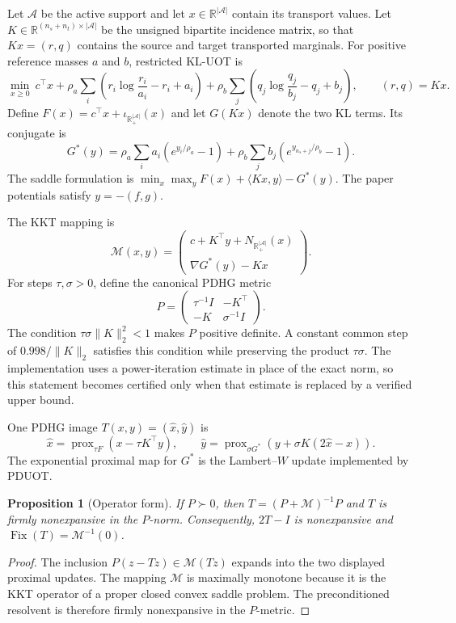 \documentclass[11pt]{article}
\newtheorem{proposition}{Proposition}
\newcommand{\R}{\mathbb{R}}
\newcommand{\prox}{\operatorname{prox}}
\newcommand{\Fix}{\operatorname{Fix}}
\begin{document}
Let $\mathcal A$ be the active support and let $x\in\R^{|\mathcal A|}$ contain its transport values.
Let $K\in\R^{(n_s+n_t)\times|\mathcal A|}$ be the unsigned bipartite incidence matrix, so that $Kx=(r,q)$ contains the source and target transported marginals.
For positive reference masses $a$ and $b$, restricted KL-UOT is
$$\min_{x\geq 0}\ c^\top x+\rho_a\sum_i\left(r_i\log\frac{r_i}{a_i}-r_i+a_i\right)+\rho_b\sum_j\left(q_j\log\frac{q_j}{b_j}-q_j+b_j\right),\qquad (r,q)=Kx.$$
Define $F(x)=c^\top x+\iota_{\R_+^{|\mathcal A|}}(x)$ and let $G(Kx)$ denote the two KL terms.
Its conjugate is
$$G^*(y)=\rho_a\sum_i a_i\left(e^{y_i/\rho_a}-1\right)+\rho_b\sum_j b_j\left(e^{y_{n_s+j}/\rho_b}-1\right).$$
The saddle formulation is $\min_x\max_y F(x)+\langle Kx,y\rangle-G^*(y)$.
The paper potentials satisfy $y=-(f,g)$.

The KKT mapping is
$$\mathcal M(x,y)=\begin{pmatrix}c+K^\top y+N_{\R_+^{|\mathcal A|}}(x)\\ \nabla G^*(y)-Kx\end{pmatrix}.$$
For steps $\tau,\sigma>0$, define the canonical PDHG metric
$$P=\begin{pmatrix}\tau^{-1}I&-K^\top\\-K&\sigma^{-1}I\end{pmatrix}.$$
The condition $\tau\sigma\lVert K\rVert_2^2<1$ makes $P$ positive definite.
A constant common step of $0.998/\lVert K\rVert_2$ satisfies this condition while preserving the product $\tau\sigma$.
The implementation uses a power-iteration estimate in place of the exact norm, so this statement becomes certified only when that estimate is replaced by a verified upper bound.

One PDHG image $T(x,y)=(\widehat x,\widehat y)$ is
$$\widehat x=\prox_{\tau F}(x-\tau K^\top y),\qquad \widehat y=\prox_{\sigma G^*}\left(y+\sigma K(2\widehat x-x)\right).$$
The exponential proximal map for $G^*$ is the Lambert--$W$ update implemented by PDUOT.

\begin{proposition}[Operator form]
If $P\succ0$, then $T=(P+\mathcal M)^{-1}P$ and $T$ is firmly nonexpansive in the $P$-norm.
Consequently, $2T-I$ is nonexpansive and $\Fix(T)=\mathcal M^{-1}(0)$.
\end{proposition}

\begin{proof}
The inclusion $P(z-Tz)\in\mathcal M(Tz)$ expands into the two displayed proximal updates.
The mapping $\mathcal M$ is maximally monotone because it is the KKT operator of a proper closed convex saddle problem.
The preconditioned resolvent is therefore firmly nonexpansive in the $P$-metric.
\end{proof}
\end{document}
